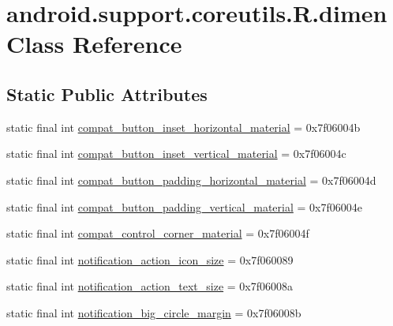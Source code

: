 \hypertarget{classandroid_1_1support_1_1coreutils_1_1_r_1_1dimen}{}\section{android.\+support.\+coreutils.\+R.\+dimen Class Reference}
\label{classandroid_1_1support_1_1coreutils_1_1_r_1_1dimen}
\subsection*{Static Public Attributes}
\begin{DoxyCompactItemize}
\item 
static final int \mbox{\hyperlink{classandroid_1_1support_1_1coreutils_1_1_r_1_1dimen_a3eda6883fabb40fd1a42d367c9d84546}{compat\+\_\+button\+\_\+inset\+\_\+horizontal\+\_\+material}} = 0x7f06004b
\item 
static final int \mbox{\hyperlink{classandroid_1_1support_1_1coreutils_1_1_r_1_1dimen_a1a581e0badd6274fd0f459cb7947dffc}{compat\+\_\+button\+\_\+inset\+\_\+vertical\+\_\+material}} = 0x7f06004c
\item 
static final int \mbox{\hyperlink{classandroid_1_1support_1_1coreutils_1_1_r_1_1dimen_a83eadc9252b9318b03a426348f03b27b}{compat\+\_\+button\+\_\+padding\+\_\+horizontal\+\_\+material}} = 0x7f06004d
\item 
static final int \mbox{\hyperlink{classandroid_1_1support_1_1coreutils_1_1_r_1_1dimen_ac79aade48ea532c4173da6d630ff19e0}{compat\+\_\+button\+\_\+padding\+\_\+vertical\+\_\+material}} = 0x7f06004e
\item 
static final int \mbox{\hyperlink{classandroid_1_1support_1_1coreutils_1_1_r_1_1dimen_a8fceafeb765594a0a0989e0d8f851870}{compat\+\_\+control\+\_\+corner\+\_\+material}} = 0x7f06004f
\item 
static final int \mbox{\hyperlink{classandroid_1_1support_1_1coreutils_1_1_r_1_1dimen_abd6b6e58abcb4ced360e86029e3e7c38}{notification\+\_\+action\+\_\+icon\+\_\+size}} = 0x7f060089
\item 
static final int \mbox{\hyperlink{classandroid_1_1support_1_1coreutils_1_1_r_1_1dimen_a6118f81c0331cdd2b9ee3a70ccfadb7c}{notification\+\_\+action\+\_\+text\+\_\+size}} = 0x7f06008a
\item 
static final int \mbox{\hyperlink{classandroid_1_1support_1_1coreutils_1_1_r_1_1dimen_a5953ab2be3dcb6f580440fd10a42e505}{notification\+\_\+big\+\_\+circle\+\_\+margin}} = 0x7f06008b
\item 

\end{DoxyCompactItemize}

